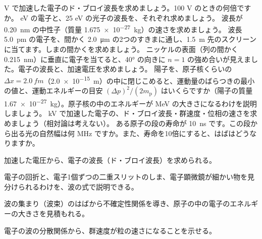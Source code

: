 \bkendproblems
{}
 V で加速した電子のド・ブロイ波長を求めましょう。100 V のときの何倍ですか。
 eV の電子と、25 eV の光子の波長を、それぞれ求めましょう。
\bkproblem 波長が \qty{0.20}{nm} の中性子（質量 \qty{1.675e-27}{kg}）の速さを求めましょう。
\bkproblem 波長 \qty{5.0}{pm} の電子を、間かく \qty{2.0}{\micro m} の2つのすきまに通し、\qty{1.5}{m} 先のスクリーンに当てます。しまの間かくを求めましょう。
\bkproblem ニッケルの表面（列の間かく \qty{0.215}{nm}）に垂直に電子を当てると、40° の向きに $n=1$ の強め合いが見えました。電子の波長と、加速電圧を求めましょう。
\bkproblem 陽子を、原子核くらいの $\Delta x=\qty{2.0}{fm}$（\qty{2.0e-15}{m}）の中に閉じこめると、運動量のばらつきの最小の値と、運動エネルギーの目安 $(\Delta p)^2/(2m_{\mathrm p})$ はいくらですか（陽子の質量 \qty{1.67e-27}{kg}）。原子核の中のエネルギーが MeV の大きさになるわけを説明しましょう。
 kV で加速した電子の、ド・ブロイ波長・群速度・位相の速さを求めましょう（相対論は考えない）。
\bkproblem ある原子の段の寿命が \qty{10}{ns} です。この段から出る光の自然幅は何 MHz ですか。また、寿命を10倍にすると、はばはどうなりますか。

\begin{furikaeri}
\begin{checklist}
\item 加速した電圧から、電子の波長（ド・ブロイ波長）を求められる。
\item 電子の回折と、電子1個ずつの二重スリットのしま、電子顕微鏡が細かい物を見分けられるわけを、波の式で説明できる。
\item 波の集まり（波束）のはばから不確定性関係を導き、原子の中の電子のエネルギーの大きさを見積もれる。
\item 電子の波の分散関係から、群速度が粒の速さになることを示せる。
\end{checklist}
\end{furikaeri}
